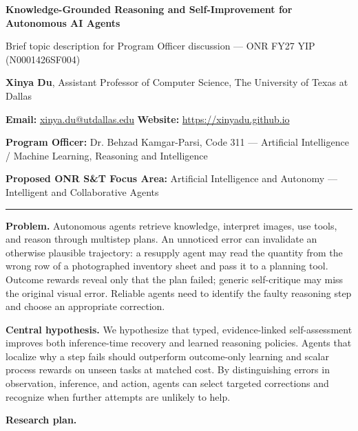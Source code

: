 \documentclass[11pt,letterpaper]{article}
\newcommand{\head}[1]{\textbf{#1}\enspace}
\newcommand{\POline}{Dr. Behzad Kamgar-Parsi, Code 311 --- Artificial Intelligence / Machine Learning, Reasoning and Intelligence}
\newcommand{\FocusArea}{Artificial Intelligence and Autonomy --- Intelligent and Collaborative Agents}
\begin{document}
\begin{center}
{\fontsize{14}{16}\selectfont\bfseries Knowledge-Grounded Reasoning and Self-Improvement for Autonomous AI Agents\par}
\vspace{2pt}
{\small Brief topic description for Program Officer discussion --- ONR FY27 YIP (N0001426SF004)}
\end{center}
\vspace{-2pt}
{\small \textbf{Xinya Du}, Assistant Professor of Computer Science, The University of Texas at Dallas\par
\textbf{Email:} \href{mailto:xinya.du@utdallas.edu}{xinya.du@utdallas.edu} \quad \textbf{Website:} \href{https://xinyadu.github.io}{https://xinyadu.github.io}\par
\textbf{Program Officer:} \POline\par
\textbf{Proposed ONR S\&T Focus Area:} \FocusArea\par}
\vspace{2pt}\hrule\vspace{5pt}
\head{Problem.} Autonomous agents retrieve knowledge, interpret images, use tools, and reason through multistep plans. An unnoticed error can invalidate an otherwise plausible trajectory: a resupply agent may read the quantity from the wrong row of a photographed inventory sheet and pass it to a planning tool. Outcome rewards reveal only that the plan failed; generic self-critique may miss the original visual error. Reliable agents need to identify the faulty reasoning step and choose an appropriate correction.
\par\head{Central hypothesis.} We hypothesize that typed, evidence-linked self-assessment improves both inference-time recovery and learned reasoning policies. Agents that localize why a step fails should outperform outcome-only learning and scalar process rewards on unseen tasks at matched cost. By distinguishing errors in observation, inference, and action, agents can select targeted corrections and recognize when further attempts are unlikely to help.
\par\head{Research plan.}
\end{document}
